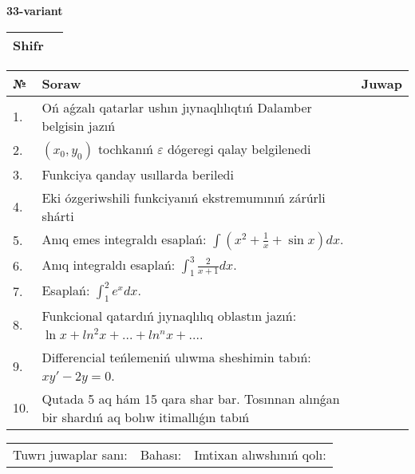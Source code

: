 \documentclass{article}
\begin{document}
  \egroup
  
  \newpage
  
  
  \textbf{33-variant}\\
  
  \bgroup
  \def\arraystretch{1.6} %
  
  \begin{tabular}{|m{5.7cm}|m{9.5cm}|}
  \hline
  Shifr & \\
  \hline
  \end{tabular}
  
  \vspace{1cm}
  
  \begin{tabular}{|m{0.7cm}|m{10cm}|m{4cm}|}
  \hline
  № & Soraw & Juwap \\
  \hline
  1. & Oń aǵzalı qatarlar ushın jıynaqlılıqtıń Dalamber belgisin jazıń &  \\
  \hline
  2. & \((x_0,y_0)\) tochkanıń \(\varepsilon\) dógeregi qalay belgilenedi &  \\
  \hline
  3. & Funkciya qanday usıllarda beriledi &  \\
  \hline
  4. & Eki ózgeriwshili funkciyanıń ekstremumınıń zárúrli shárti &  \\
  \hline
  5. & Anıq emes integraldı esaplań: \(\int{\left( x^2  + \frac{1}{x} + \sin x \right)dx}\). &  \\
  \hline
  6. & Anıq integraldı esaplań: \(\int_{1}^{3}\frac{2}{x + 1}dx\). &  \\
  \hline
  7. & Esaplań: \(\int_{1}^2 {e^{x}dx}\). &  \\
  \hline
  8. & Funkcional qatardıń jıynaqlılıq oblastın jazıń: \(\ln x + ln^2 x + ... + ln^{n}x + ...\). &  \\
  \hline
  9. & Differencial teńlemeniń ulıwma sheshimin tabıń: \(xy' - 2y = 0\). &  \\
  \hline
  10. & Qutada 5 aq hám 15 qara shar bar. Tosınnan alınǵan bir shardıń aq bolıw itimallıǵın tabıń &  \\
  \hline
  \end{tabular}
  
  \vspace{1cm}
  
  \begin{tabular}{lll}
  Tuwrı juwaplar sanı: \underline{\hspace{1.5cm}} & 
  Bahası: \underline{\hspace{1.5cm}} & 
  Imtixan alıwshınıń qolı: \underline{\hspace{2cm}} \\
  \end{tabular}
  
\end{document}
